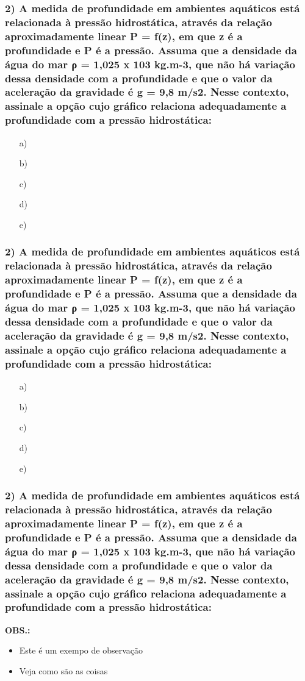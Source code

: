 \documentclass[12pt]{beamer}
\begin{document}
\begin{frame}
\frametitle{2) A medida de profundidade em ambientes aquáticos está relacionada à pressão hidrostática, através da relação aproximadamente linear P = f(z), em que z é a profundidade e P é a pressão. Assuma que a densidade da água do mar ρ = 1,025 x 103 kg.m-3, que não há variação dessa densidade com a profundidade e que o valor da aceleração da gravidade é g = 9,8 m/s2. Nesse contexto, assinale a opção cujo gráfico relaciona adequadamente a profundidade com a pressão hidrostática:}
{\BodySize
\begin{itemize}
\item[a)] \fbox{\rule{0pt}{4cm}\rule{6cm}{0pt}}
\item[b)] \fbox{\rule{0pt}{4cm}\rule{6cm}{0pt}}
\item[c)] \fbox{\rule{0pt}{4cm}\rule{6cm}{0pt}}
\item[d)] \fbox{\rule{0pt}{4cm}\rule{6cm}{0pt}}
\item[e)] \fbox{\rule{0pt}{4cm}\rule{6cm}{0pt}}
\end{itemize}
}
\end{frame}

\begin{frame}
\frametitle{2) A medida de profundidade em ambientes aquáticos está relacionada à pressão hidrostática, através da relação aproximadamente linear P = f(z), em que z é a profundidade e P é a pressão. Assuma que a densidade da água do mar ρ = 1,025 x 103 kg.m-3, que não há variação dessa densidade com a profundidade e que o valor da aceleração da gravidade é g = 9,8 m/s2. Nesse contexto, assinale a opção cujo gráfico relaciona adequadamente a profundidade com a pressão hidrostática:}
{\BodySize
\begin{itemize}
\item[a)] \fbox{\rule{0pt}{4cm}\rule{6cm}{0pt}}
\item[b)] \fbox{\rule{0pt}{4cm}\rule{6cm}{0pt}}
\item[c)] \fbox{\rule{0pt}{4cm}\rule{6cm}{0pt}}
\item[d)] \fbox{\rule{0pt}{4cm}\rule{6cm}{0pt}}
\item[e)] \fbox{\rule{0pt}{4cm}\rule{6cm}{0pt}}
\end{itemize}
}
\end{frame}

\begin{frame}
\frametitle{2) A medida de profundidade em ambientes aquáticos está relacionada à pressão hidrostática, através da relação aproximadamente linear P = f(z), em que z é a profundidade e P é a pressão. Assuma que a densidade da água do mar ρ = 1,025 x 103 kg.m-3, que não há variação dessa densidade com a profundidade e que o valor da aceleração da gravidade é g = 9,8 m/s2. Nesse contexto, assinale a opção cujo gráfico relaciona adequadamente a profundidade com a pressão hidrostática:}
{\BodySize
\textbf{OBS.:}
\begin{itemize}
\item Este é um exempo de observação
\item Veja como são as coisas
\end{itemize}
}
\end{frame}
\end{document}
